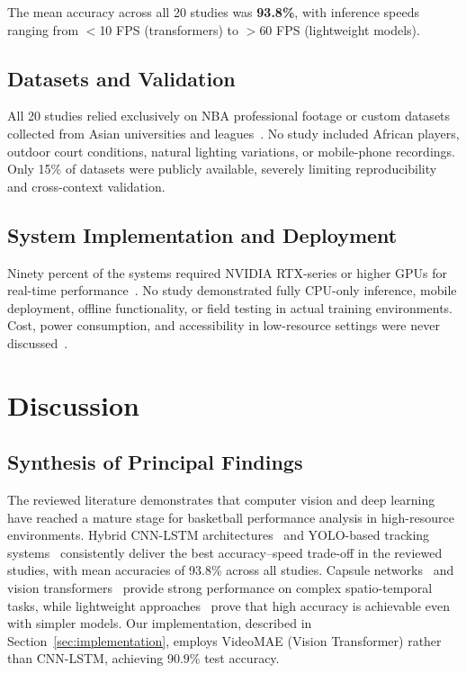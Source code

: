 \documentclass[conference]{IEEEtran}
\begin{document}
The mean accuracy across all 20 studies was \textbf{93.8\%}, with inference speeds ranging from $<$10 FPS (transformers) to $>$60 FPS (lightweight models).

\subsection{Datasets and Validation}
All 20 studies relied exclusively on NBA professional footage or custom datasets collected from Asian universities and leagues~\cite{li2023yolo,wang2024hoop,zhang2025sensor,tian2019strategies,nguyen2021mlsport}. No study included African players, outdoor court conditions, natural lighting variations, or mobile-phone recordings. Only 15\% of datasets were publicly available, severely limiting reproducibility and cross-context validation.

\subsection{System Implementation and Deployment}
Ninety percent of the systems required NVIDIA RTX-series or higher GPUs for real-time performance~\cite{yan2024xgboost,wang2022explainable,stacked2025ensemble}. No study demonstrated fully CPU-only inference, mobile deployment, offline functionality, or field testing in actual training environments. Cost, power consumption, and accessibility in low-resource settings were never discussed~\cite{li2025defensive,nagorna2025tactical,ding2025thermal}.



\section{Discussion}

\subsection{Synthesis of Principal Findings}
The reviewed literature demonstrates that computer vision and deep learning have reached a mature stage for basketball performance analysis in high-resource environments. Hybrid CNN-LSTM architectures~\cite{li2023yolo,zhang2024acahet} and YOLO-based tracking systems~\cite{cheng2022ann,tian2019strategies} consistently deliver the best accuracy–speed trade-off in the reviewed studies, with mean accuracies of 93.8\% across all studies. Capsule networks~\cite{sha2025capsnet} and vision transformers~\cite{wang2024hoop,yan2024xgboost} provide strong performance on complex spatio-temporal tasks, while lightweight approaches~\cite{zhang2025sensor,libin2025personalized,yang2020training} prove that high accuracy is achievable even with simpler models. Our implementation, described in Section~\ref{sec:implementation}, employs VideoMAE (Vision Transformer) rather than CNN-LSTM, achieving 90.9\% test accuracy.
\end{document}
